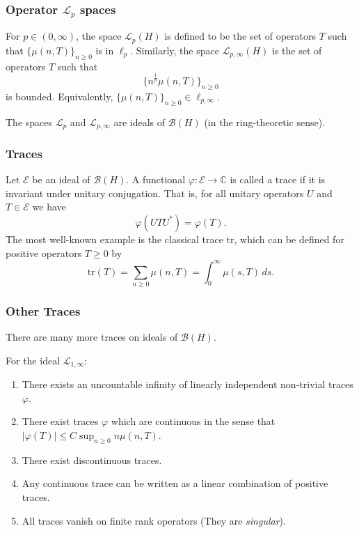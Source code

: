 \documentclass{beamer} %
\theoremstyle{definition} %
\newcommand{\Cplx}{\mathbb{C}}
\newcommand{\tr}{\mathrm{tr}}
\begin{document}
\begin{frame}\frametitle{Operator $\mathcal{L}_p$ spaces}
    For $p \in (0,\infty)$, the space $\mathcal{L}_p(H)$ is defined to be the set of operators $T$ such that $\{\mu(n,T)\}_{n\geq 0}$
    is in $\ell_p$. Similarly, the space $\mathcal{L}_{p,\infty}(H)$ is the set of operators $T$ such that
    \begin{equation*}
        \{n^{\frac{1}{p}}\mu(n,T)\}_{n\geq 0}
    \end{equation*}
    is bounded. Equivalently, $\{\mu(n,T)\}_{n\geq 0} \in \ell_{p,\infty}$.
    
    The spaces $\mathcal{L}_p$ and $\mathcal{L}_{p,\infty}$ are ideals of $\mathcal{B}(H)$ (in the ring-theoretic sense).
\end{frame}

\begin{frame}\frametitle{Traces}
    Let $\mathcal{E}$ be an ideal of $\mathcal{B}(H)$. A functional $\varphi:\mathcal{E}\to \Cplx$ is called a trace if it is invariant under unitary conjugation. That is,
    for all unitary operators $U$ and $T \in \mathcal{E}$ we have
    \begin{equation*}
        \varphi(UTU^*) = \varphi(T).
    \end{equation*}
    The most well-known example is the classical trace $\tr$, which can be defined for positive operators $T \geq 0$ by
    \begin{equation*}
        \tr(T) = \sum_{n\geq 0} \mu(n,T) = \int_{0}^\infty \mu(s,T)\,ds.
    \end{equation*}
\end{frame}

\begin{frame}\frametitle{Other Traces}
    There are many more traces on ideals of $\mathcal{B}(H)$.
    
    For the ideal $\mathcal{L}_{1,\infty}$:
    \begin{enumerate}
        \item{} There exists an uncountable infinity of linearly independent non-trivial traces $\varphi$.
        \item{} There exist traces $\varphi$ which are continuous in the sense that $|\varphi(T)| \leq C\sup_{n\geq 0} n\mu(n,T)$.
        \item{} There exist discontinuous traces.
        \item{} Any continuous trace can be written as a linear combination of positive traces.
        \item{} All traces vanish on finite rank operators (They are \emph{singular}). 
    \end{enumerate} 
\end{frame}
\end{document}
